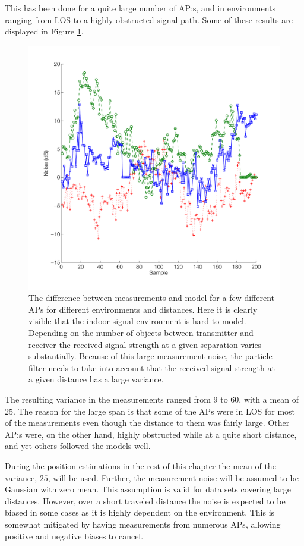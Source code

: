 \documentclass{LTHthesis}
\begin{document}
This has been done for a quite large number of AP:s, and in environments ranging from LOS to a highly obstructed signal path. Some of these results are displayed in Figure \ref{noise_behaviour}. 
%
\begin{figure}[!hbt]

\includegraphics[width=1\textwidth ]{images/pure_rssi/noise_behaviour}
\caption{The difference between measurements and model for a few different APs for different environments and distances. Here it is clearly visible that the indoor signal environment is hard to model. Depending on the number of objects between transmitter and receiver the received signal strength at a given separation varies substantially. Because of this large measurement noise, the particle filter needs to take into account that the received signal strength at a given distance has a large variance. }\label{noise_behaviour}
\end{figure}

The resulting variance in the measurements ranged from $9$ to $60$, with a mean of $25$. The reason for the large span is that some of the APs were in LOS for most of the measurements even though the distance to them was fairly large. Other AP:s were, on the other hand, highly obstructed while at a quite short distance, and yet others followed the models well. 

During the position estimations in the rest of this chapter the mean of the variance, $25$, will be used. Further, the measurement noise will be assumed to be Gaussian with zero mean. This assumption is valid for data sets covering large distances. However, over a short traveled distance the noise is expected to be biased in some cases as it is highly dependent on the environment. This is somewhat mitigated by having measurements from numerous APs, allowing positive and negative biases to cancel.
\end{document}
